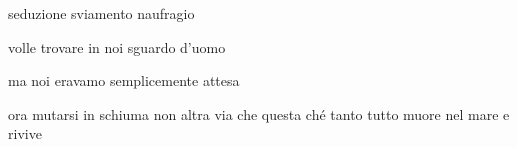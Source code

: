 \clearpage


\begin{poem}
	\begin{stanza}
		seduzione\verseline
		sviamento\verseline
		naufragio
	\end{stanza}

	\begin{stanza}
		volle trovare in noi sguardo d’uomo
	\end{stanza}

	\begin{stanza}
		ma noi eravamo semplicemente\verseline
		attesa
	\end{stanza}

	\begin{stanza}
		ora mutarsi in schiuma\verseline
		non altra via che questa\verseline
		ché tanto\verseline
		tutto muore nel mare\verseline
		e rivive
	\end{stanza}
\end{poem}

\clearpage


